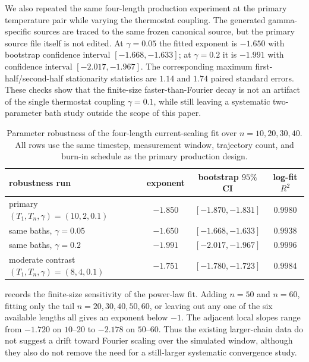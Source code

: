 \documentclass[11pt,a4paper]{article}
\theoremstyle{definition}
\numberwithin{equation}{section}   %
\begin{document}
We also repeated the same four-length production experiment at the primary
temperature pair while varying the thermostat coupling.  The generated
gamma-specific sources are traced to the same frozen canonical source, but the
primary source file itself is not edited.  At $\gamma=0.05$ the fitted exponent
is $-1.650$ with bootstrap confidence interval $[-1.668,-1.633]$; at
$\gamma=0.2$ it is $-1.991$ with confidence interval
$[-2.017,-1.967]$.  The corresponding maximum first-half/second-half
stationarity statistics are $1.14$ and $1.74$ paired standard errors.  These
checks show that the finite-size faster-than-Fourier decay is not an artifact
of the single thermostat coupling $\gamma=0.1$, while still leaving a
systematic two-parameter bath study outside the scope of this paper.

\begin{table}[ht]\centering
\small
\begin{tabular}{lccc}
\toprule
robustness run & exponent & bootstrap $95\%$ CI & log-fit $R^2$ \\
\midrule
primary $(T_1,T_n,\gamma)=(10,2,0.1)$ & $-1.850$ & $[-1.870,-1.831]$ & $0.9980$ \\
same baths, $\gamma=0.05$ & $-1.650$ & $[-1.668,-1.633]$ & $0.9938$ \\
same baths, $\gamma=0.2$ & $-1.991$ & $[-2.017,-1.967]$ & $0.9996$ \\
moderate contrast $(T_1,T_n,\gamma)=(8,4,0.1)$ & $-1.751$ & $[-1.780,-1.723]$ & $0.9984$ \\
\bottomrule
\end{tabular}
\caption{Parameter robustness of the four-length current-scaling fit over
$n=10,20,30,40$.  All rows use the same timestep, measurement window,
trajectory count, and burn-in schedule as the primary production design.}
\label{tab:parameter-robustness}
\end{table}

 records the finite-size sensitivity of the
power-law fit. Adding $n=50$ and $n=60$, fitting only the tail
$n=20,30,40,50,60$, or leaving out any one of the six available lengths all
gives an exponent below $-1$. The adjacent local slopes range from $-1.720$ on
$10$--$20$ to $-2.178$ on $50$--$60$.  Thus the existing larger-chain data do
not suggest a drift toward Fourier scaling over the simulated window, although
they also do not remove the need for a still-larger systematic convergence
study.
\end{document}
